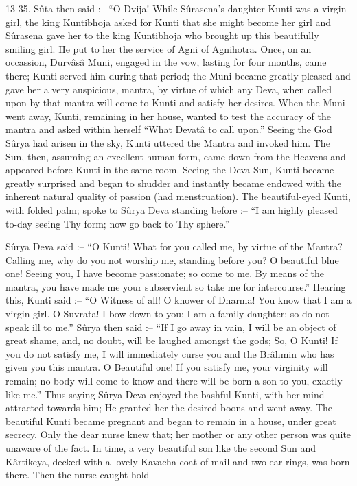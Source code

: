 13-35. Sûta then said :-- “O Dvija! While Sûrasena's daughter Kunti was a virgin girl, the king Kuntibhoja asked for Kunti that she might become her girl and Sûrasena gave her to the king Kuntibhoja who brought up this beautifully smiling girl. He put to her the service of Agni of Agnihotra. Once, on an occassion, Durvâsâ Muni, engaged in the vow, lasting for four months, came there; Kunti served him during that period; the Muni became greatly pleased and gave her a very auspicious, mantra, by virtue of which any Deva, when called upon by that mantra will come to Kunti and satisfy her desires. When the Muni went away, Kunti, remaining in her house, wanted to test the accuracy of the mantra and asked within herself  “What Devatâ to call upon.” Seeing the God Sûrya had arisen in the sky, Kunti uttered the Mantra and invoked him. The Sun, then, assuming an excellent human form, came down from the Heavens and appeared before Kunti in the same room. Seeing the Deva Sun, Kunti became greatly surprised and began to shudder and instantly became endowed with the inherent natural quality of passion (had menstruation). The beautiful-eyed Kunti, with folded palm; spoke to Sûrya Deva standing before :-- “I am highly pleased to-day seeing Thy form; now go back to Thy sphere.”

 

Sûrya Deva said :-- “O Kunti! What for you called me, by virtue of the Mantra? Calling me, why do you not worship me, standing before you? O beautiful blue one! Seeing you, I have become passionate; so come to me. By means of the mantra, you have made me your subservient so take me for intercourse.” Hearing this, Kunti said :-- “O Witness of all! O knower of Dharma! You know that I am a virgin girl. O Suvrata! I bow down to you; I am a family daughter; so do not speak ill to me.” Sûrya then said :-- “If I go away in vain, I will be an object of great shame, and, no doubt, will be laughed amongst the gods; So, O Kunti! If you do not satisfy me, I will immediately curse you and the Brâhmin who has given you this mantra. O Beautiful one! If you satisfy me, your virginity will remain; no body will come to know and there will be born a son to you, exactly like me.” Thus saying Sûrya Deva enjoyed the bashful Kunti, with her mind attracted towards him; He granted her the desired boons and went away. The beautiful Kunti became pregnant and began to remain in a house, under great secrecy. Only the dear nurse knew that; her mother or any other person was quite unaware of the fact. In time, a very beautiful son like the second Sun and Kârtikeya, decked with a lovely Kavacha coat of mail and two ear-rings, was born there. Then the nurse caught hold

